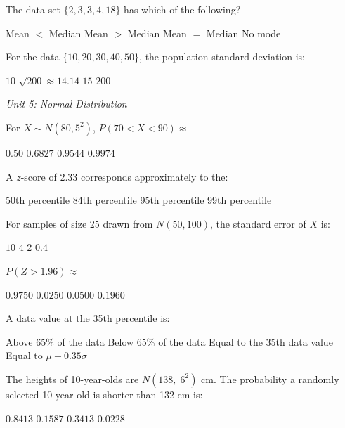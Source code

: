 \documentclass[addpoints]{exam}
\begin{document}
\begin{questions}
\question[1] The data set $\{2, 3, 3, 4, 18\}$ has which of the following?
\begin{choices}
    \choice Mean $<$ Median
    \correctchoice Mean $>$ Median
    \choice Mean $=$ Median
    \choice No mode
\end{choices}

\question[1] For the data $\{10, 20, 30, 40, 50\}$, the population standard deviation is:
\begin{choices}
    \choice $10$
    \correctchoice $\sqrt{200} \approx 14.14$
    \choice $15$
    \choice $200$
\end{choices}

\vspace{3mm}
\noindent\textit{Unit 5: Normal Distribution}
\vspace{3mm}

\question[1] For $X \sim N(80, 5^2)$, $P(70 < X < 90) \approx$
\begin{choices}
    \choice $0.50$
    \choice $0.6827$
    \correctchoice $0.9544$
    \choice $0.9974$
\end{choices}

\question[1] A $z$-score of 2.33 corresponds approximately to the:
\begin{choices}
    \choice 50th percentile
    \choice 84th percentile
    \choice 95th percentile
    \correctchoice 99th percentile
\end{choices}

\question[1] For samples of size 25 drawn from $N(50, 100)$, the standard error of
$\bar{X}$ is:
\begin{choices}
    \choice $10$
    \choice $4$
    \correctchoice $2$
    \choice $0.4$
\end{choices}

\question[1] $P(Z > 1.96) \approx$
\begin{choices}
    \choice $0.9750$
    \correctchoice $0.0250$
    \choice $0.0500$
    \choice $0.1960$
\end{choices}

\question[1] A data value at the 35th percentile is:
\begin{choices}
    \choice Above 65\% of the data
    \correctchoice Below 65\% of the data
    \choice Equal to the 35th data value
    \choice Equal to $\mu - 0.35\sigma$
\end{choices}

\question[1] The heights of 10-year-olds are $N(138,\; 6^2)$ cm. The probability a
randomly selected 10-year-old is shorter than 132 cm is:
\begin{choices}
    \choice $0.8413$
    \correctchoice $0.1587$
    \choice $0.3413$
    \choice $0.0228$
\end{choices}



\end{questions}
\end{document}
